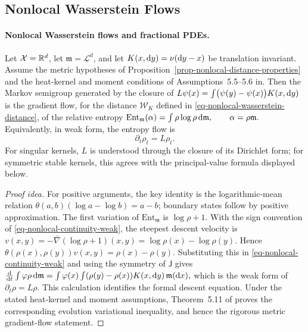 \subsection{Nonlocal Wasserstein Flows}
\label{sec-nonlocal-wasserstein-flows}
\label{sec-nonlocal-wasserstein-pdes}
\paragraph{Nonlocal Wasserstein flows and fractional PDEs.}
\begin{prop}\label{prop-nonlocal-entropy-gradient-flow}
Let $\mathcal X=\mathbb{R}^d$, let $\mathfrak m=\mathcal L^d$, and let $K(x,\mathrm{d} y)=\nu(\mathrm{d} y-x)$ be translation invariant. Assume the metric hypotheses of Proposition~\ref{prop-nonlocal-distance-properties} and the heat-kernel and moment conditions of Assumptions~5.5--5.6 in. Then the Markov semigroup generated by the closure of
\(L\psi(x) = \int\bigl(\psi(y)-\psi(x)\bigr)K(x,\mathrm{d} y)\)
is the gradient flow, for the distance \(\mathcal W_K\) defined in \eqref{eq-nonlocal-wasserstein-distance}, of the relative entropy
\(\mathrm{Ent}_{\mathfrak m}(\alpha) = \int \rho\log\rho\,\mathrm{d}\mathfrak m, \qquad \alpha=\rho\mathfrak m.\)
Equivalently, in weak form, the entropy flow is
\begin{equation}\label{eq-nonlocal-entropy-flow}
\partial_t\rho_t=L\rho_t.
\end{equation}
For singular kernels, \(L\) is understood through the closure of its Dirichlet form; for symmetric stable kernels, this agrees with the principal-value formula displayed below.
\end{prop}
\begin{proof}[Proof idea]
For positive arguments, the key identity is the logarithmic-mean relation
\(\theta(a,b)(\log a-\log b)=a-b\); boundary states follow by positive approximation.
The first variation of \(\mathrm{Ent}_{\mathfrak m}\) is \(\log\rho+1\). With the sign convention of \eqref{eq-nonlocal-continuity-weak}, the steepest descent velocity is
\(v(x,y) = -\bar\nabla(\log\rho+1)(x,y) = \log\rho(x)-\log\rho(y).\)
Hence \(\theta(\rho(x),\rho(y))v(x,y)=\rho(x)-\rho(y)\). Substituting this in \eqref{eq-nonlocal-continuity-weak} and using the symmetry of \(\mathsf J\) gives
\(\frac{\mathrm{d}}{\mathrm{d} t}\int \varphi\rho\,\mathrm{d}\mathfrak m = \int \varphi(x)\int(\rho(y)-\rho(x))K(x,\mathrm{d} y)\,\mathfrak m(\mathrm{d} x),\)
which is the weak form of \(\partial_t\rho=L\rho\). This calculation identifies the formal descent equation. Under the stated heat-kernel and moment assumptions, Theorem~5.11 of proves the corresponding evolution variational inequality, and hence the rigorous metric gradient-flow statement.
\end{proof}
